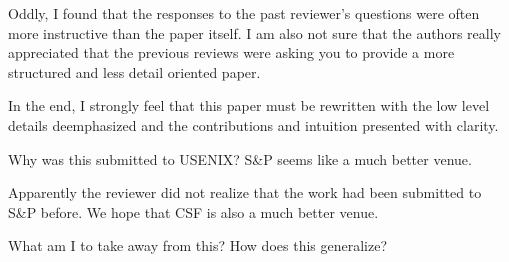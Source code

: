Oddly, I found that the responses to the past reviewer's questions were often more instructive than the paper itself. I am also not sure that the authors really appreciated that the previous reviews were asking you to provide a more structured and less detail oriented paper.

In the end, I strongly feel that this paper must be rewritten with the low level details deemphasized and the contributions and intuition presented with clarity.

\begin{center}
\end{center}

Why was this submitted to USENIX?  S\&P seems like a much better venue.
\begin{answer}
  Apparently the reviewer did not realize that the work had been submitted to S\&P before.
  We hope that CSF is also a much better venue.
\end{answer}

What am I to take away from this?  How does this generalize?
